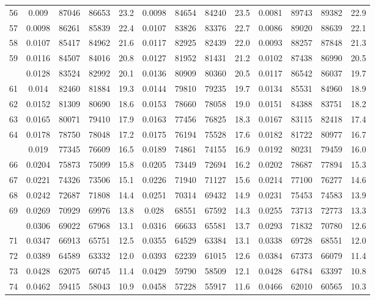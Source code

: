 \documentclass[
  14pt,
]{article}
\begin{document}
\begin{longtable}[t]{lcccccccccccc}
56 & 0.009 & 87046 & 86653 & 23.2 & 0.0098 & 84654 & 84240 & 23.5 & 0.0081 & 89743 & 89382 & 22.9\\
57 & 0.0098 & 86261 & 85839 & 22.4 & 0.0107 & 83826 & 83376 & 22.7 & 0.0086 & 89020 & 88639 & 22.1\\
58 & 0.0107 & 85417 & 84962 & 21.6 & 0.0117 & 82925 & 82439 & 22.0 & 0.0093 & 88257 & 87848 & 21.3\\
59 & 0.0116 & 84507 & 84016 & 20.8 & 0.0127 & 81952 & 81431 & 21.2 & 0.0102 & 87438 & 86990 & 20.5\\
\addlinespace
60 & 0.0128 & 83524 & 82992 & 20.1 & 0.0136 & 80909 & 80360 & 20.5 & 0.0117 & 86542 & 86037 & 19.7\\
61 & 0.014 & 82460 & 81884 & 19.3 & 0.0144 & 79810 & 79235 & 19.7 & 0.0134 & 85531 & 84960 & 18.9\\
62 & 0.0152 & 81309 & 80690 & 18.6 & 0.0153 & 78660 & 78058 & 19.0 & 0.0151 & 84388 & 83751 & 18.2\\
63 & 0.0165 & 80071 & 79410 & 17.9 & 0.0163 & 77456 & 76825 & 18.3 & 0.0167 & 83115 & 82418 & 17.4\\
64 & 0.0178 & 78750 & 78048 & 17.2 & 0.0175 & 76194 & 75528 & 17.6 & 0.0182 & 81722 & 80977 & 16.7\\
\addlinespace
65 & 0.019 & 77345 & 76609 & 16.5 & 0.0189 & 74861 & 74155 & 16.9 & 0.0192 & 80231 & 79459 & 16.0\\
66 & 0.0204 & 75873 & 75099 & 15.8 & 0.0205 & 73449 & 72694 & 16.2 & 0.0202 & 78687 & 77894 & 15.3\\
67 & 0.0221 & 74326 & 73506 & 15.1 & 0.0226 & 71940 & 71127 & 15.6 & 0.0214 & 77100 & 76277 & 14.6\\
68 & 0.0242 & 72687 & 71808 & 14.4 & 0.0251 & 70314 & 69432 & 14.9 & 0.0231 & 75453 & 74583 & 13.9\\
69 & 0.0269 & 70929 & 69976 & 13.8 & 0.028 & 68551 & 67592 & 14.3 & 0.0255 & 73713 & 72773 & 13.3\\
\addlinespace
70 & 0.0306 & 69022 & 67968 & 13.1 & 0.0316 & 66633 & 65581 & 13.7 & 0.0293 & 71832 & 70780 & 12.6\\
71 & 0.0347 & 66913 & 65751 & 12.5 & 0.0355 & 64529 & 63384 & 13.1 & 0.0338 & 69728 & 68551 & 12.0\\
72 & 0.0389 & 64589 & 63332 & 12.0 & 0.0393 & 62239 & 61015 & 12.6 & 0.0384 & 67373 & 66079 & 11.4\\
73 & 0.0428 & 62075 & 60745 & 11.4 & 0.0429 & 59790 & 58509 & 12.1 & 0.0428 & 64784 & 63397 & 10.8\\
74 & 0.0462 & 59415 & 58043 & 10.9 & 0.0458 & 57228 & 55917 & 11.6 & 0.0466 & 62010 & 60565 & 10.3\\

\end{longtable}
\end{document}
